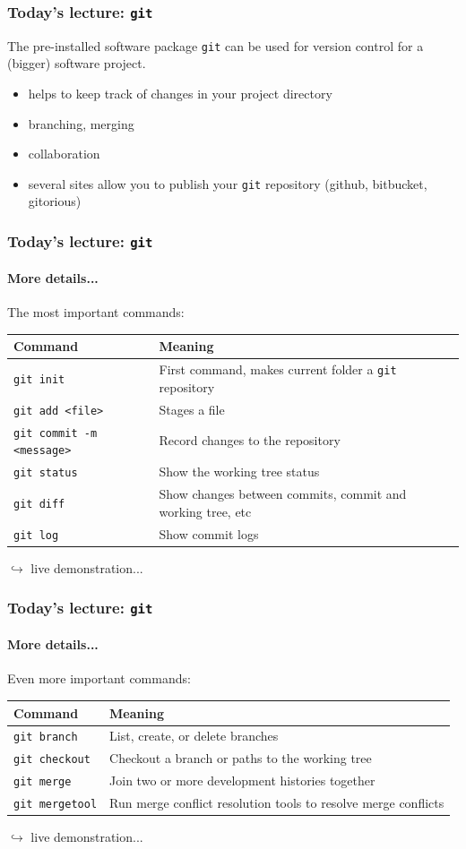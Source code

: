 \documentclass{beamer}
\begin{document}
\begin{frame}
\frametitle{Today's lecture: \texttt{git}}
The pre-installed software package \texttt{git} can be used for version control for a (bigger) software project.
\begin{itemize}
 \item helps to keep track of changes in your project directory
 \item branching, merging
 \item collaboration
 \item several sites allow you to publish your \texttt{git} repository (github, bitbucket, gitorious) 
\end{itemize}
\end{frame}
\begin{frame}
\frametitle{Today's lecture: \texttt{git}}
\framesubtitle{More details...}
The most important commands:

\begin{table}
\begin{tabularx}{\textwidth}{l|X}
Command & Meaning \\
 \hline
 \texttt{git init} & First command, makes current folder a \texttt{git} repository\\
 \texttt{git add <file>} & Stages a file\\
 \texttt{git commit -m <message>} & Record changes to the repository\\
 \texttt{git status} & Show the working tree status\\
 \texttt{git diff} & Show changes between commits, commit and working tree, etc\\
 \texttt{git log} & Show commit logs\\
\end{tabularx}
\end{table}
\hfill $\hookrightarrow$ live demonstration...
\end{frame}
\begin{frame}
\frametitle{Today's lecture: \texttt{git}}
\framesubtitle{More details...}
Even more important commands:
\begin{table}
\begin{tabularx}{\textwidth}{l|X}
Command & Meaning \\
 \hline
 \texttt{git branch} & List, create, or delete branches\\
 \texttt{git checkout} & Checkout a branch or paths to the working tree\\
 \texttt{git merge} & Join two or more development histories together\\
 \texttt{git mergetool} & Run merge conflict resolution tools to resolve merge conflicts\\
\end{tabularx}
\end{table}
\hfill $\hookrightarrow$ live demonstration...
\end{frame}
\end{document}
